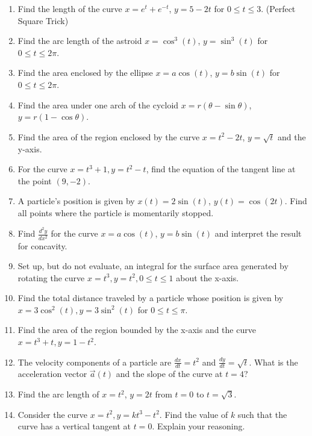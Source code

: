 \documentclass{article}
\begin{document}
\begin{enumerate}
\item Find the length of the curve $x = e^t + e^{-t}$, $y = 5 - 2t$ for $0 \le t \le 3$. (Perfect Square Trick)

\item Find the arc length of the astroid $x = \cos^3(t)$, $y = \sin^3(t)$ for $0 \le t \le 2\pi$.

\item Find the area enclosed by the ellipse $x=a\cos(t)$, $y=b\sin(t)$ for $0 \le t \le 2\pi$.

\item Find the area under one arch of the cycloid $x=r(\theta-\sin\theta)$, $y=r(1-\cos\theta)$.

\item Find the area of the region enclosed by the curve $x=t^2-2t$, $y=\sqrt{t}$ and the y-axis.

\item For the curve $x=t^3+1, y=t^2-t$, find the equation of the tangent line at the point $(9,-2)$.

\item A particle's position is given by $x(t) = 2\sin(t)$, $y(t) = \cos(2t)$. Find all points where the particle is momentarily stopped.

\item Find $\frac{d^2y}{dx^2}$ for the curve $x=a\cos(t)$, $y=b\sin(t)$ and interpret the result for concavity.

\item Set up, but do not evaluate, an integral for the surface area generated by rotating the curve $x=t^3, y=t^2, 0 \le t \le 1$ about the x-axis.

\item Find the total distance traveled by a particle whose position is given by $x=3\cos^2(t), y=3\sin^2(t)$ for $0 \le t \le \pi$.

\item Find the area of the region bounded by the x-axis and the curve $x=t^3+t, y=1-t^2$.

\item The velocity components of a particle are $\frac{dx}{dt} = t^2$ and $\frac{dy}{dt} = \sqrt{t}$. What is the acceleration vector $\vec{a}(t)$ and the slope of the curve at $t=4$?

\item Find the arc length of $x=t^2$, $y=2t$ from $t=0$ to $t=\sqrt{3}$.

\item Consider the curve $x=t^2, y=k t^3 - t^2$. Find the value of $k$ such that the curve has a vertical tangent at $t=0$. Explain your reasoning.


\end{enumerate}
\end{document}
